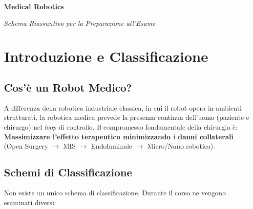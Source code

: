 \documentclass[11pt,a4paper,twoside]{report}
\begin{document}
\begin{titlepage}
    \centering
    \vspace*{4cm}
    {\Huge \bfseries Medical Robotics\par}
    \vspace{1cm}
    {\Large \itshape Schema Riassuntivo per la Preparazione all'Esame\par}
\end{titlepage}

\tableofcontents
\newpage

\chapter{Introduzione e Classificazione}

\section{Cos'è un Robot Medico?}
A differenza della robotica industriale classica, in cui il robot opera in ambienti strutturati, la robotica medica prevede la presenza continua dell'uomo (paziente e chirurgo) nel \textit{loop} di controllo. 
Il compromesso fondamentale della chirurgia è: \textbf{Massimizzare l'effetto terapeutico minimizzando i danni collaterali} (Open Surgery $\rightarrow$ MIS $\rightarrow$ Endoluminale $\rightarrow$ Micro/Nano robotica).

\section{Schemi di Classificazione}
Non esiste un unico schema di classificazione. Durante il corso ne vengono esaminati diversi:
\end{document}
